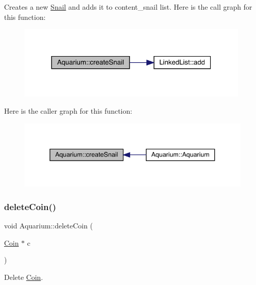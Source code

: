 Creates a new \mbox{\hyperlink{class_snail}{Snail}} and adds it to content\+\_\+snail list. Here is the call graph for this function\+:\nopagebreak
\begin{figure}[H]
\begin{center}
\leavevmode
\includegraphics[width=314pt]{class_aquarium_ae631c3fd8587b1889ffea4e0ade6359e_cgraph}
\end{center}
\end{figure}
Here is the caller graph for this function\+:\nopagebreak
\begin{figure}[H]
\begin{center}
\leavevmode
\includegraphics[width=338pt]{class_aquarium_ae631c3fd8587b1889ffea4e0ade6359e_icgraph}
\end{center}
\end{figure}
\mbox{\label{class_aquarium_a187e59dd6efd62b577e97b8e00237c77}} 
\subsubsection{\texorpdfstring{delete\+Coin()}{deleteCoin()}}
{\footnotesize\ttfamily void Aquarium\+::delete\+Coin (\begin{DoxyParamCaption}\item[{\mbox{\hyperlink{class_coin}{Coin}} $\ast$}]{c }\end{DoxyParamCaption})}



Delete \mbox{\hyperlink{class_coin}{Coin}}. 

